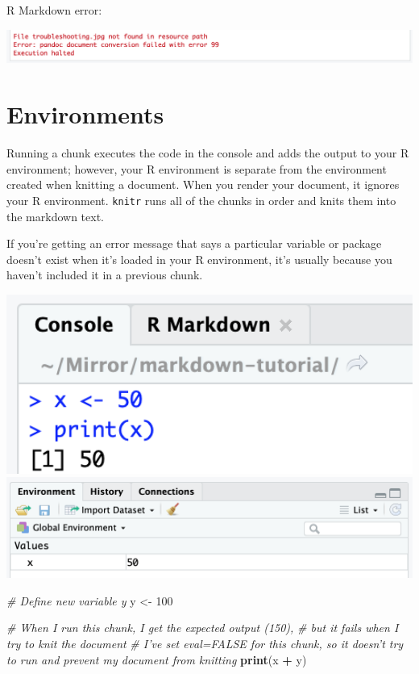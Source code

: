 \documentclass[
]{book}
\newenvironment{Shaded}{\begin{snugshade}}{\end{snugshade}}
\newcommand{\CommentTok}[1]{\textcolor[rgb]{0.56,0.35,0.01}{\textit{#1}}}
\newcommand{\DecValTok}[1]{\textcolor[rgb]{0.00,0.00,0.81}{#1}}
\newcommand{\KeywordTok}[1]{\textcolor[rgb]{0.13,0.29,0.53}{\textbf{#1}}}
\newcommand{\NormalTok}[1]{#1}
\newcommand{\OperatorTok}[1]{\textcolor[rgb]{0.81,0.36,0.00}{\textbf{#1}}}
\newcommand{\StringTok}[1]{\textcolor[rgb]{0.31,0.60,0.02}{#1}}
\begin{document}
R Markdown error:

\includegraphics[width=21.33in]{images/error_conversion}

\hypertarget{environments}{%
\section{Environments}\label{environments}}

Running a chunk executes the code in the console and adds the output to your R environment; however, your R environment is separate from the environment created when knitting a document. When you render your document, it ignores your R environment. \texttt{knitr} runs all of the chunks in order and knits them into the markdown text.

If you're getting an error message that says a particular variable or package doesn't exist when it's loaded in your R environment, it's usually because you haven't included it in a previous chunk.

\includegraphics[width=6.44in]{images/environment_console}
\includegraphics[width=14.11in]{images/environment_var}

\begin{Shaded}
\begin{Highlighting}[]
\CommentTok{# Define new variable y}
\NormalTok{y <-}\StringTok{ }\DecValTok{100}

\CommentTok{# When I run this chunk, I get the expected output (150),}
\CommentTok{# but it fails when I try to knit the document}
\CommentTok{# I've set eval=FALSE for this chunk, so it doesn't try to run and prevent my document from knitting}
\KeywordTok{print}\NormalTok{(x }\OperatorTok{+}\StringTok{ }\NormalTok{y)}
\end{Highlighting}
\end{Shaded}
\end{document}
